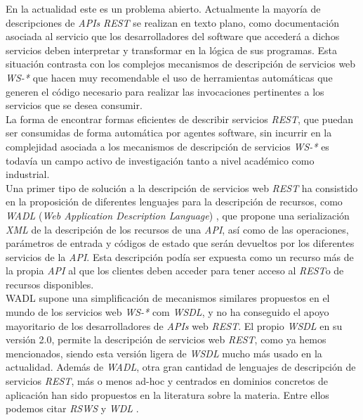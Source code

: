 En la actualidad este es un problema abierto. Actualmente la mayor\'ia de descripciones de \textit{APIs} \textit{REST} se realizan en texto plano, como documentaci\'on asociada al servicio que los desarrolladores del software que acceder\'a a dichos servicios deben interpretar y transformar en la l\'ogica de sus programas. Esta situaci\'on contrasta con los complejos mecanismos de descripci\'on de servicios web \textit{WS-*} que hacen muy recomendable el uso de herramientas autom\'aticas que generen el c\'odigo necesario para realizar las invocaciones pertinentes a los servicios que se desea consumir. \\

La forma de encontrar formas eficientes de describir servicios \textit{REST}, que puedan ser consumidas de forma autom\'atica por agentes software, sin incurrir en la complejidad asociada a los mecanismos de  descripci\'on de servicios \textit{WS-*} es todav\'ia un campo activo de investigaci\'on tanto a nivel acad\'emico como industrial.\\

Una primer tipo de soluci\'on a la descripci\'on de servicios web \textit{REST} ha consistido en la proposici\'on de diferentes lenguajes para la descripci\'on de recursos, como \textit{WADL} (\textit{Web Application Description Language}) \cite{wadl}, que propone una serializaci\'on \textit{XML} de la descripci\'on de los recursos de una \textit{API}, as\'i como de las operaciones, par\'ametros de entrada y c\'odigos de estado que ser\'an devueltos por los diferentes servicios de la \textit{API}. Esta descripci\'on pod\'ia ser expuesta como un recurso m\'as de la propia \textit{API} al que los clientes deben acceder para tener acceso al \textit{REST}o de recursos disponibles.\\

WADL supone una simplificaci\'on de mecanismos similares propuestos en el mundo de los servicios web \textit{WS-*} com \textit{WSDL}, y no ha conseguido el apoyo mayoritario de los desarrolladores de \textit{APIs} web \textit{REST}. El propio \textit{WSDL} en su versi\'on 2.0, permite la descripci\'on de servicios web \textit{REST}, como ya hemos mencionados, siendo esta versi\'on ligera de \textit{WSDL} mucho m\'as usado en la actualidad. Adem\'as de \textit{WADL}, otra gran cantidad de lenguajes de descripci\'on de servicios \textit{REST}, m\'as o menos ad-hoc y centrados en dominios concretos de aplicaci\'on han sido propuestos en la literatura sobre la materia. Entre ellos podemos citar \textit{RSWS} y \textit{WDL} \cite{lanthaler2010towards}.\\


